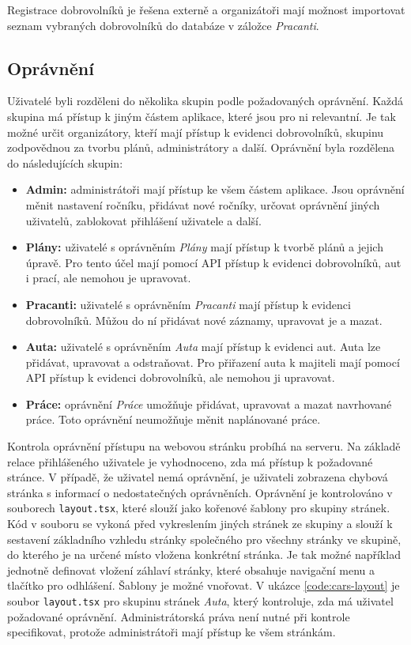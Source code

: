 Registrace dobrovolníků je řešena externě a organizátoři mají možnost importovat seznam vybraných dobrovolníků do databáze v záložce \textit{Pracanti}.

\subsection{Oprávnění}

Uživatelé byli rozděleni do několika skupin podle požadovaných oprávnění. Každá skupina má přístup k jiným částem aplikace, které jsou pro ni relevantní.
Je tak možné určit organizátory, kteří mají přístup k evidenci dobrovolníků, skupinu zodpovědnou za tvorbu plánů, administrátory a další.
Oprávnění byla rozdělena do následujících skupin:

\begin{itemize}
    \item \textbf{Admin:} administrátoři mají přístup ke všem částem aplikace. Jsou oprávnění měnit nastavení ročníku, přidávat nové ročníky, určovat oprávnění jiných uživatelů, zablokovat přihlášení uživatele a další.
    \item \textbf{Plány:} uživatelé s oprávněním \textit{Plány} mají přístup k tvorbě plánů a jejich úpravě. Pro tento účel mají pomocí API přístup k evidenci dobrovolníků, aut i prací, ale nemohou je upravovat.
    \item \textbf{Pracanti:} uživatelé s oprávněním \textit{Pracanti} mají přístup k evidenci dobrovolníků. Můžou do ní přidávat nové záznamy, upravovat je a mazat.
    \item \textbf{Auta:} uživatelé s oprávněním \textit{Auta} mají přístup k evidenci aut. Auta lze přidávat, upravovat a odstraňovat. Pro přiřazení auta k majiteli mají pomocí API přístup k evidenci dobrovolníků, ale nemohou ji upravovat.
    \item \textbf{Práce:} oprávnění \textit{Práce} umožňuje přidávat, upravovat a mazat navrhované práce. Toto oprávnění neumožňuje měnit naplánované práce.
\end{itemize}

Kontrola oprávnění přístupu na webovou stránku probíhá na serveru. Na základě relace přihlášeného uživatele je vyhodnoceno, zda má přístup k požadované stránce.
V případě, že uživatel nemá oprávnění, je uživateli zobrazena chybová stránka s informací o nedostatečných oprávněních.
Oprávnění je kontrolováno v souborech \texttt{layout.tsx}, které slouží jako kořenové šablony pro skupiny stránek. Kód v souboru se vykoná před vykreslením
jiných stránek ze skupiny a slouží k sestavení základního vzhledu stránky společného pro všechny stránky ve skupině, do kterého je na určené místo vložena konkrétní stránka.
Je tak možné například jednotně definovat vložení záhlaví stránky, které obsahuje navigační menu a tlačítko pro odhlášení. Šablony je možné vnořovat.
V ukázce \ref{code:cars-layout} je soubor \texttt{layout.tsx} pro skupinu stránek \textit{Auta}, který kontroluje, zda má uživatel požadované oprávnění.
Administrátorská práva není nutné při kontrole specifikovat, protože administrátoři mají přístup ke všem stránkám.

